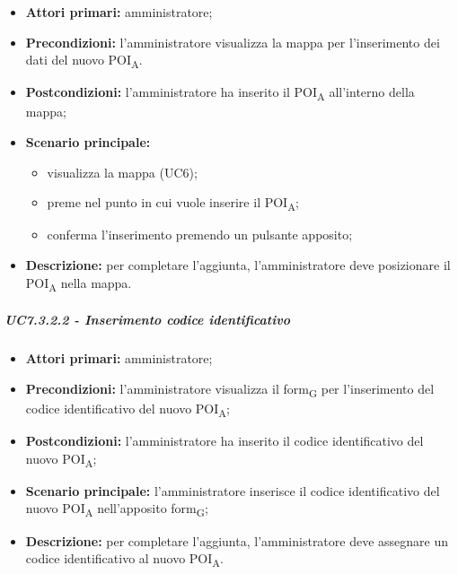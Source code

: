 \begin{itemize}

   \item   \textbf{Attori primari:} amministratore;

\item   \textbf{Precondizioni:} l'amministratore visualizza la mappa per l'inserimento dei dati del nuovo POI\textsubscript{A}.

  \item   \textbf{Postcondizioni:} l'amministratore ha inserito il POI\textsubscript{A} all'interno della mappa; 

   \item   \textbf{Scenario principale:}

    \begin{itemize}
        \item visualizza la mappa (UC6);

        \item preme nel punto in cui vuole inserire il POI\textsubscript{A};
		     \item conferma l'inserimento premendo un pulsante apposito;

   \end{itemize}

   \item   \textbf{Descrizione:} per completare l'aggiunta, l'amministratore deve posizionare il POI\textsubscript{A} nella mappa.



\end{itemize}



\subparagraph{UC7.3.2.2 - Inserimento codice identificativo}

\begin{itemize}

  \item   \textbf{Attori primari:} amministratore;

   \item   \textbf{Precondizioni:} l'amministratore visualizza il form\textsubscript{G} per l'inserimento del codice identificativo del nuovo POI\textsubscript{A};

   \item   \textbf{Postcondizioni:} l'amministratore ha inserito il codice identificativo del nuovo POI\textsubscript{A}; 

   \item   \textbf{Scenario principale:} l'amministratore inserisce il codice identificativo del nuovo POI\textsubscript{A} nell'apposito form\textsubscript{G};

   \item   \textbf{Descrizione:} per completare l'aggiunta, l'amministratore deve assegnare un codice identificativo al nuovo POI\textsubscript{A}.



\end{itemize}



